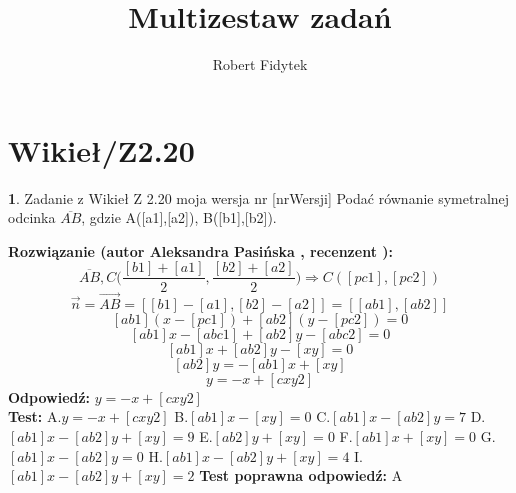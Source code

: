 \documentclass[12pt, a4paper]{article}
\title{Multizestaw zadań}
\author{Robert Fidytek}
\date{}
\theoremstyle{definition} %
\newtheorem{zad}{}
\newcommand{\kategoria}[1]{\section{#1}} %
\newcommand{\zadStart}[1]{\begin{zad}#1\newline} %
\newcommand{\zadStop}{\end{zad}}   %
\newcommand{\rozwStart}[2]{\noindent \textbf{Rozwiązanie (autor #1 , recenzent #2): }\newline} %
\newcommand{\rozwStop}{\newline}                                            %
\newcommand{\odpStart}{\noindent \textbf{Odpowiedź:}\newline}    %
\newcommand{\odpStop}{\newline}                                             %
\newcommand{\testStart}{\noindent \textbf{Test:}\newline} %
\newcommand{\testStop}{\newline} %
\newcommand{\kluczStart}{\noindent \textbf{Test poprawna odpowiedź:}\newline} %
\newcommand{\kluczStop}{\newline} %
\begin{document}
\maketitle


\kategoria{Wikieł/Z2.20}
\zadStart{Zadanie z Wikieł Z 2.20 moja wersja nr [nrWersji]}
Podać równanie symetralnej odcinka $\overline{AB}$, gdzie A([a1],[a2]), B([b1],[b2]).
\zadStop
\rozwStart{Aleksandra Pasińska}{}
$$\overline{AB}, C\biggl(\frac{[b1]+[a1]}{2},\frac{[b2]+[a2]}{2}\biggr)\Rightarrow C([pc1],[pc2])$$
$$\vec n=\overrightarrow{AB}=[[b1]-[a1],[b2]-[a2]]=[[ab1],[ab2]]$$
$$[ab1](x-[pc1])+[ab2](y-[pc2])=0$$
$$[ab1]x-[abc1]+[ab2]y-[abc2]=0$$
$$[ab1]x+[ab2]y-[xy]=0$$
$$[ab2]y=-[ab1]x+[xy]$$
$$y=-x+[cxy2]$$
\rozwStop
\odpStart
$y=-x+[cxy2]$\\
\odpStop
\testStart
A.$y=-x+[cxy2]$
B.$[ab1]x-[xy]=0$
C.$[ab1]x-[ab2]y=7$
D.$[ab1]x-[ab2]y+[xy]=9$
E.$[ab2]y+[xy]=0$
F.$[ab1]x+[xy]=0$
G.$[ab1]x-[ab2]y=0$
H.$[ab1]x-[ab2]y+[xy]=4$
I.$[ab1]x-[ab2]y+[xy]=2$
\testStop
\kluczStart
A
\kluczStop
\end{document}
